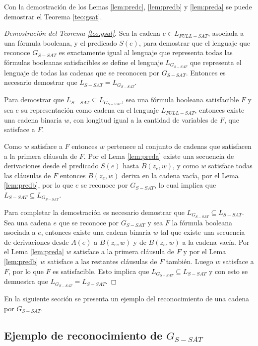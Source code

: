 Con la demostración de los Lemas \ref{lem:predc}, \ref{lem:predb} y \ref{lem:preda} se puede demostrar el Teorema \ref{teo:gsat}.

\begin{proof}[Demostración del Teorema \ref{teo:gsat}]
    Sea la cadena $e\in L_{FULL-SAT}$, asociada a una fórmula booleana, y el predicado $S(e)$, para demostrar que el lenguaje que reconoce $G_{S-SAT}$ es exactamente igual al lenguaje que representa todas las fórmulas booleanas satisfacibles se define el lenguaje $L_{G_{S-SAT}}$ que representa el lenguaje de todas las cadenas que se reconocen por $G_{S-SAT}$. Entonces es necesario demostrar que $L_{S-SAT}=L_{G_{S-SAT}}$.
    
    Para demostrar que $L_{S-SAT}\subseteq L_{G_{S-SAT}}$, sea una fórmula booleana satisfacible $F$ y sea $e$ su representación como cadena en el lenguaje $L_{FULL-SAT}$, entonces existe una cadena binaria $w$, con longitud igual a la cantidad de variables de $F$, que satisface a $F$.
    
    Como $w$ satisface a $F$ entonces $w$ pertenece al conjunto de cadenas que satisfacen a la primera cláusula de $F$. Por el Lema \ref{lem:preda} existe una secuencia de derivaciones desde el predicado $S(e)$ hasta $B(z_e,w)$, y como $w$ satisface todas las cláusulas de $F$ entonces $B(z_e,w)$ deriva en la cadena vacía, por el Lema \ref{lem:predb}, por lo que $e$ se reconoce por $G_{S-SAT}$, lo cual implica que $L_{S-SAT}\subseteq L_{G_{S-SAT}}$.
    
    Para completar la demostración es necesario demostrar que $ L_{G_{S-SAT}}\subseteq L_{S-SAT}$. Sea una cadena $e$ que se reconoce por $G_{S-SAT}$ y sea $F$ la fórmula booleana asociada a $e$, entonces existe una cadena binaria $w$ tal que existe una secuencia de derivaciones desde $A(e)$ a $B(z_e,w)$ y de $B(z_e,w)$ a la cadena vacía. Por el Lema \ref{lem:preda} $w$ satisface a la primera cláusula de $F$ y por el Lema  \ref{lem:predb} $w$ satisface a las restantes cláusulas de $F$ también. Luego $w$ satisface a $F$, por lo que $F$ es satisfacible. Esto implica que $L_{G_{S-SAT}}\subseteq L_{S-SAT}$ y con esto se demuestra que $L_{G_{S-SAT}}= L_{S-SAT}$.
\end{proof}


En la siguiente sección se presenta un ejemplo del reconocimiento de una cadena por $G_{S-SAT}$.

\subsection{Ejemplo de reconocimiento de $G_{S-SAT}$}

